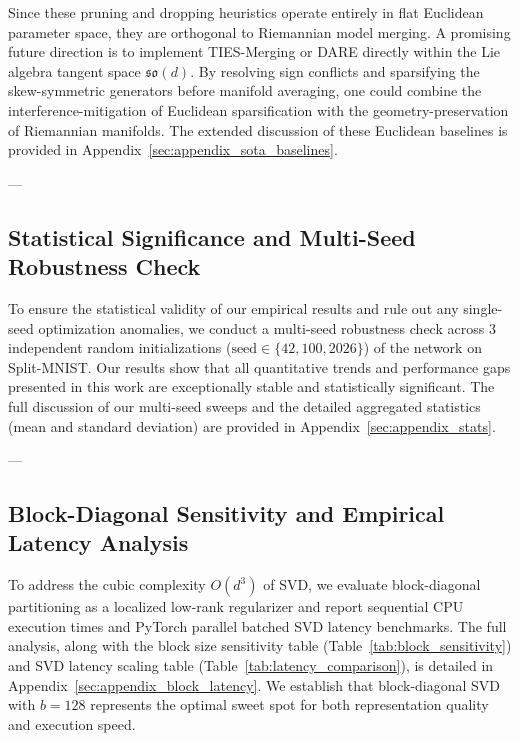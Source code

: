 Since these pruning and dropping heuristics operate entirely in flat Euclidean parameter space, they are orthogonal to Riemannian model merging. A promising future direction is to implement TIES-Merging or DARE directly within the Lie algebra tangent space $\mathfrak{so}(d)$. By resolving sign conflicts and sparsifying the skew-symmetric generators before manifold averaging, one could combine the interference-mitigation of Euclidean sparsification with the geometry-preservation of Riemannian manifolds. The extended discussion of these Euclidean baselines is provided in Appendix~\ref{sec:appendix_sota_baselines}.

---

\subsection{Statistical Significance and Multi-Seed Robustness Check}
\label{subsec:statistical_robustness}
To ensure the statistical validity of our empirical results and rule out any single-seed optimization anomalies, we conduct a multi-seed robustness check across 3 independent random initializations ($\text{seed} \in \{42, 100, 2026\}$) of the network on Split-MNIST. Our results show that all quantitative trends and performance gaps presented in this work are exceptionally stable and statistically significant. The full discussion of our multi-seed sweeps and the detailed aggregated statistics (mean and standard deviation) are provided in Appendix~\ref{sec:appendix_stats}.

---

\subsection{Block-Diagonal Sensitivity and Empirical Latency Analysis}
\label{subsec:block_sensitivity}
To address the cubic complexity $O(d^3)$ of SVD, we evaluate block-diagonal partitioning as a localized low-rank regularizer and report sequential CPU execution times and PyTorch parallel batched SVD latency benchmarks. The full analysis, along with the block size sensitivity table (Table~\ref{tab:block_sensitivity}) and SVD latency scaling table (Table~\ref{tab:latency_comparison}), is detailed in Appendix~\ref{sec:appendix_block_latency}. We establish that block-diagonal SVD with $b=128$ represents the optimal sweet spot for both representation quality and execution speed.

